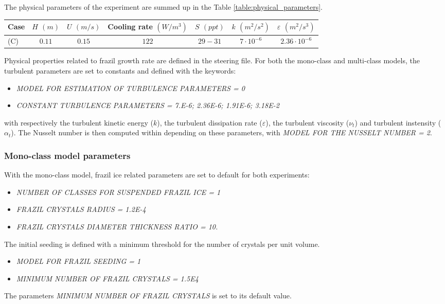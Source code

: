 The physical parameters of the experiment are summed up in the Table \ref{table:physical_parameters}.
\begin{center}
\begin{tabular}{lcccccc}
\hline
Case & $H$ $(m)$ & $U$ $(m/s)$ & Cooling rate $(W/m^3)$ & $S$ $(ppt)$ & $k$ $(m^2/s^2)$ & $\varepsilon$ $(m^2/s^3)$ \\
\hline \hline
(C) & $0.11$ & $0.15$ & $122$ & $29-31$ & $7 \cdot 10^{-6}$ & $2.36 \cdot 10^{-6}$ \\
\hline
\end{tabular}
\label{table:physical_parameters}
\end{center}

Physical properties related to frazil growth rate are defined in the \khione steering file. 
For both the mono-class and multi-class models, the turbulent parameters are set to constants
and defined with the keywords:
\begin{itemize}
	\item\textit{MODEL FOR ESTIMATION OF TURBULENCE PARAMETERS = 0}
	\item\textit{CONSTANT TURBULENCE PARAMETERS = 7.E-6; 2.36E-6; 1.91E-6; 3.18E-2}
\end{itemize}
with respectively the turbulent kinetic energy ($k$),
the turbulent dissipation rate ($\varepsilon$), the turbulent viscosity ($\nu_t$) and 
turbulent instensity ($\alpha_t$).
The Nusselt number is then computed within \khione depending on these parameters, 
with \textit{MODEL FOR THE NUSSELT NUMBER = 2}.

\subsubsection{Mono-class model parameters}
With the mono-class model, frazil ice related parameters are set to default 
for both experiments:
\begin{itemize}
	\item\textit{NUMBER OF CLASSES FOR SUSPENDED FRAZIL ICE = 1}
	\item\textit{FRAZIL CRYSTALS RADIUS = 1.2E-4}
	\item\textit{FRAZIL CRYSTALS DIAMETER THICKNESS RATIO = 10.}
\end{itemize}

The initial seeding is defined with a minimum threshold for the number of crystals per unit volume.
\begin{itemize}
  \item\textit{MODEL FOR FRAZIL SEEDING = 1}
  \item\textit{MINIMUM NUMBER OF FRAZIL CRYSTALS = 1.5E4}
\end{itemize}
The parameters \textit{MINIMUM NUMBER OF FRAZIL CRYSTALS} is set to its default value.

